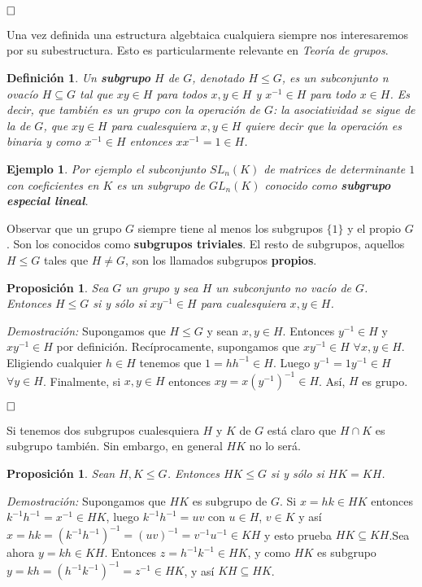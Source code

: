 \documentclass[12pt]{article}
\newtheorem{proposition}[theorem]{Proposición}
\newtheorem{definition}[theorem]{Definición}
\newtheorem{example}{Ejemplo}[theorem]
\begin{document}
$\hfill \square$

Una vez definida una estructura algebtaica cualquiera siempre nos interesaremos por su subestructura. Esto es particularmente relevante en \textit{Teoría de grupos}.

\begin{definition}Un \textbf{subgrupo} $H$ de $G$, denotado $H \leq G$, es un subconjunto n ovacío $H \subseteq G$ tal que $xy \in H$ para todos $x,y \in H$ y $x^{-1} \in H$ para todo $x \in H$. Es decir, que también es un grupo con la operación de $G$: la asociatividad se sigue de la de $G$, que $xy \in H$ para cualesquiera $x,y \in H$ quiere decir que la operación es binaria y como $x^{-1} \in H$ entonces $xx^{-1} = 1 \in H$.
\end{definition}

\begin{example}Por ejemplo el subconjunto $SL_{n}(K)$ de matrices de determinante $1$ con coeficientes en $K$ es un subgrupo de $GL_n(K)$ conocido como \textbf{subgrupo especial lineal}.
\end{example}

Observar que un grupo $G$ siempre tiene al menos los subgrupos $ \lbrace 1 \rbrace$ y el propio $G$. Son los conocidos como \textbf{subgrupos triviales}. El resto de subgrupos, aquellos $H \leq G $ tales que $H \neq G$, son los llamados subgrupos \textbf{propios}.

\begin{proposition}Sea $G$ un grupo y sea $H$ un subconjunto no vacío de $G$. Entonces $H \leq G$ si y sólo si $xy^{-1} \in H$ para cualesquiera $x,y \in H$.
\end{proposition}
\emph{Demostración: }
Supongamos que $H \leq G$ y sean $x,y \in H$. Entonces $y^{-1} \in H$ y $xy^{-1} \in H$ por definición. Recíprocamente, supongamos que $xy^{-1} \in H$ $\forall x,y \in H$. Eligiendo cualquier $h \in H$ tenemos que $1 = h h^{-1} \in H$. Luego $y^{-1} = 1y^{-1} \in H$ $\forall y \in H$. Finalmente, si $x,y \in H$ entonces $xy = x(y^{-1})^{-1} \in H$. Así, $H$ es grupo.

$\hfill \square$

Si tenemos dos subgrupos cualesquiera $H$ y $K$ de $G$ está claro que $H \cap K$ es subgrupo también. Sin embargo, en general $HK$ no lo será.

\begin{proposition}\label{eq:progruesgru} Sean $H,K \leq G$. Entonces $HK \leq G$ si y sólo si $HK = KH$.
\end{proposition}
\emph{Demostración: }Supongamos que $HK$ es subgrupo de $G$. Si $x = hk \in HK$ entonces $k^{-1}h^{-1} = x^{-1} \in HK$, luego $k^{-1}h^{-1} = uv$ con $u \in H$, $v \in K$ y así $x = hk = (k^{-1}h^{-1})^{-1} = (uv)^{-1} = v^{-1}u^{-1} \in KH$ y esto prueba $HK \subseteq KH$.Sea ahora $y = kh \in KH$. Entonces $z = h^{-1}k^{-1} \in HK$, y como $HK$ es subgrupo $y = kh = (h^{-1}k^{-1})^{-1} = z^{-1} \in HK$, y así $KH \subseteq HK$.
 
\end{document}
